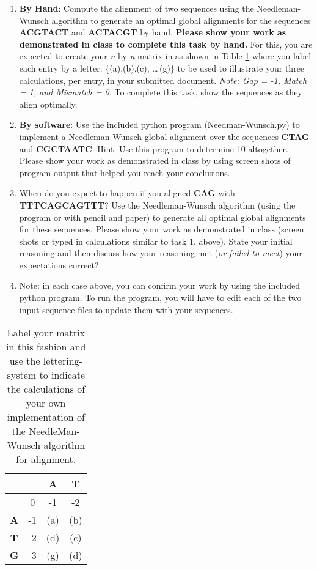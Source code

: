 \begin{enumerate}
	\item \textbf{By Hand}: Compute the alignment of two sequences using the Needleman-Wunsch algorithm to generate an optimal global alignments for the sequences {\color{red} \textbf{ACGTACT}} and {\color{red} \textbf{ACTACGT}} by hand.  \textbf{Please show your work as demonstrated in class to complete this task by hand.} For this, you are expected to create your \emph{n} by \emph{n} matrix in as shown in Table \ref{tab:matrix} where you label each entry by a letter: \{(a),(b),(c), \dots\,(g)\} to be used to illustrate your three calculations, per entry, in your submitted document. \emph{Note: Gap = -1, Match = 1, and Mismatch = 0.} To complete this task, show the sequences as they align optimally.

	
	\item \textbf{By software}: Use the included python program (Needman-Wunsch.py) to implement a Needleman-Wunsch global alignment over the sequences {\color{red} \textbf{CTAG}} and {\color{red} \textbf{CGCTAATC}}.  Hint: Use this program to determine 10 altogether.  Please show your work as demonstrated in class by using screen shots of program output that helped you reach your conclusions. 
	
	
	\item When do you expect to happen if you aligned {\color{red} \textbf{CAG}} with {\color{red} \textbf{TTTCAGCAGTTT}}? Use the Needleman-Wunsch algorithm (using the program or with pencil and paper) to generate all optimal global alignments for these sequences.  Please show your work as demonstrated in class (screen shots or typed in calculations similar to task 1, above).  State your initial reasoning and then discuss how your reasoning met (\emph{or failed to meet}) your expectations correct?


	\item Note: in each case above, you can confirm your work by using the included python program. To run the program, you will have to edit each of the two input sequence files to update them with your sequences.
\end{enumerate}

\begin{table}[h!]
	\caption{Label your matrix in this fashion and use the lettering-system to indicate the calculations of your own implementation of the NeedleMan-Wunsch algorithm for alignment.}
	\label{tab:matrix}
	\begin{center}
	\begin{tabular}{|c||c|c|c|}
	\hline
		&&{\color{red}\textbf{A}}&{\color{red}\textbf{T}}\\
		\hline\hline
		&0&-1&-2\\
		\hline
		{\color{red}\textbf{A}}&-1&(a)&(b)\\
		\hline
		{\color{red}\textbf{T}}&-2&(d)&(c)\\
		\hline
		{\color{red}\textbf{G}}&-3&(g)&(d)\\
	\hline
	\end{tabular}
	\end{center}
\end{table}


